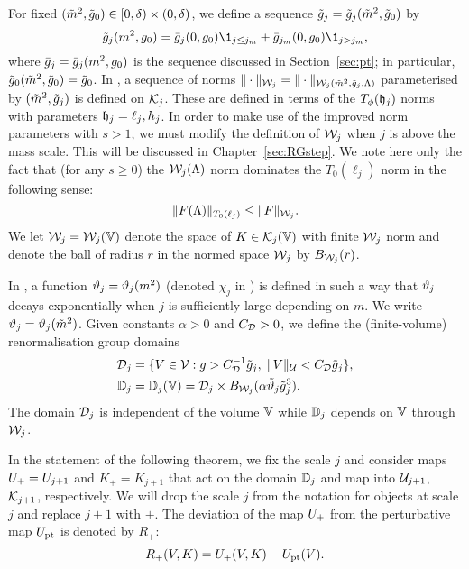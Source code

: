 For fixed $(\tilde{m}^2, \tilde{g}_0) \in [0, \delta) \times (0, \delta)$,
we define a sequence $\tilde{g}_j = \tilde{g}_j(\tilde{m}^2, \tilde{g}_0)$ by
\begin{equation} \label{e:ggendef}
  \ggen_j(m^2,g_0) =
  \gbar_j(0,g_0) \1_{j \le j_m} + \gbar_{j_m}(0,g_0) \1_{j > j_m},
\end{equation}
where $\bar{g}_j = \bar{g}_j(m^2, g_0)$ is the sequence discussed in Section~\ref{sec:pt};
in particular, $\tilde{g}_0(\tilde{m}^2, \tilde{g}_0) = \tilde{g}_0$.
In \cite[Section~\ref{step-sec:Knorms}]{BS-rg-step},
a sequence of norms $\|\cdot\|_{\mathcal{W}_j} = \|\cdot\|_{\mathcal{W}_j(\tilde{m}^2, \tilde{g}_j, \Lambda)}$
parameterised by $(\tilde{m}^2, \tilde{g}_j)$ is defined on $\mathcal{K}_j$.
These are defined in terms of the $T_\phi(\mathfrak{h}_j)$ norms with parameters $\mathfrak{h}_j = \ell_j, h_j$.
In order to make use of the improved norm parameters with $s > 1$,
we must modify the definition of $\mathcal{W}_j$ when $j$ is above the mass scale.
This will be discussed in Chapter~\ref{sec:RGstep}.
We note here only the fact that (for any $s \ge 0$) the $\mathcal{W}_j(\Lambda)$
norm dominates the $T_0(\ell_j)$ norm in the following sense:
\begin{equation}
\label{e:T0dom}
\|F(\Lambda)\|_{T_0(\ell_j)} \le \|F\|_{\mathcal{W}_j}.
\end{equation}
We let $\mathcal{W}_j = \mathcal{W}_j(\mathbb{V})$ denote the space of $K\in\mathcal{K}_j(\mathbb{V})$ with
finite $\mathcal{W}_j$ norm and
denote the ball of radius $r$ in the normed space $\mathcal{W}_j$ by $B_{\mathcal{W}_j}(r)$.

In \cite[\eqref{log-e:mass-scale}--\eqref{log-e:chidef}]{BBS-saw4-log},
a function $\vartheta_j = \vartheta_j(m^2)$ (denoted $\chi_j$ in \cite{BBS-saw4-log})
is defined in such a way that $\vartheta_j$ decays exponentially
when $j$ is sufficiently large depending on $m$. We write $\tilde{\vartheta}_j = \vartheta_j(\tilde{m}^2)$.
Given constants $\alpha > 0$ and $C_{\mathcal{D}} > 0$, we define the (finite-volume)
renormalisation group domains
\begin{align}
\label{e:DVdef}
\mathcal{D}_j
	&=
\{ V\in \mathcal{V} :
	g > C_{\mathcal{D}}^{-1} \tilde{g}_j, \; \|V\|_{\mathcal{U}} < C_{\mathcal{D}} \tilde{g}_j \}, \\
\label{e:domRG}
\mathbb{D}_j
	&= \mathbb{D}_j(\mathbb{V})
	= \mathcal{D}_j \times B_{\mathcal{W}_j}(\alpha \tilde{\vartheta}_j \tilde{g}_j^3).
\end{align}
The domain $\mathcal{D}_j$ is independent of the volume $\mathbb{V}$ while $\mathbb{D}_j$
depends on $\mathbb{V}$ through $\mathcal{W}_j$.

In the statement of the following theorem, we fix the scale $j$ and
consider maps $U_+ = U_{j+1}$ and $K_+ = K_{j+1}$ that act on the domain
$\mathbb{D}_j$ and map into $\mathcal{U}_{j+1}$, $\mathcal{K}_{j+1}$, respectively.
We will drop the scale $j$ from the notation for objects at scale $j$
and replace $j + 1$ with $+$.
The deviation of the map $U_+$ from the perturbative map $U_{\rm pt}$
is denoted by $R_+$:
\begin{equation}
\label{e:Rplusdef}
    R_+(V,K) = U_+(V,K) -U_{\rm pt}(V).
\end{equation}

